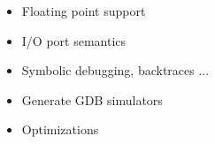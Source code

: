 \begin{block}{\large {}\vphantom{Future Work}}
    \begin{itemize}
        \item Floating point support
        \item I/O port semantics
        \item Symbolic debugging, backtraces ...
        \item Generate GDB simulators
        \item Optimizations
    \end{itemize}
\end{block}
